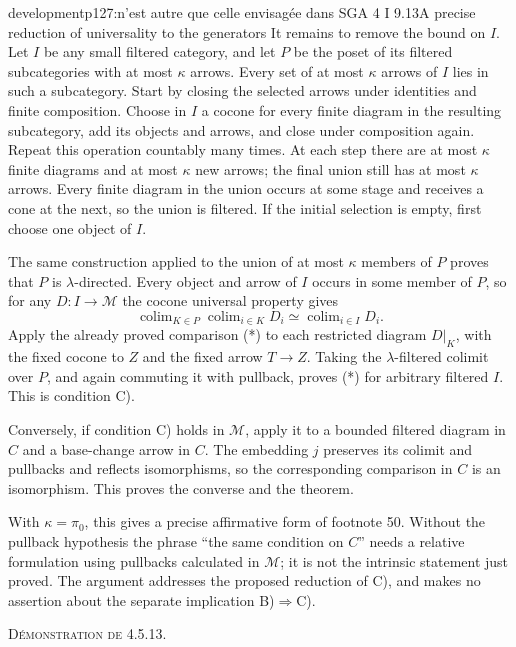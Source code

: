 \begin{dcomment}{development}{p127:n'est autre que celle envisagée dans SGA 4 I 9.13}{A precise reduction of universality to the generators}
It remains to remove the bound on $I$. Let $I$ be any small filtered category, and let $P$ be the poset of its filtered subcategories with at most $\kappa$ arrows. Every set of at most $\kappa$ arrows of $I$ lies in such a subcategory. Start by closing the selected arrows under identities and finite composition. Choose in $I$ a cocone for every finite diagram in the resulting subcategory, add its objects and arrows, and close under composition again. Repeat this operation countably many times. At each step there are at most $\kappa$ finite diagrams and at most $\kappa$ new arrows; the final union still has at most $\kappa$ arrows. Every finite diagram in the union occurs at some stage and receives a cone at the next, so the union is filtered. If the initial selection is empty, first choose one object of $I$.

The same construction applied to the union of at most $\kappa$ members of $P$ proves that $P$ is $\lambda$-directed. Every object and arrow of $I$ occurs in some member of $P$, so for any $D:I\to\mathcal M$ the cocone universal property gives
\[
 \operatorname{colim}_{K\in P}\operatorname{colim}_{i\in K}D_i
   \simeq\operatorname{colim}_{i\in I}D_i.
\]
Apply the already proved comparison (*) to each restricted diagram $D|_K$, with the fixed cocone to $Z$ and the fixed arrow $T\to Z$. Taking the $\lambda$-filtered colimit over $P$, and again commuting it with pullback, proves (*) for arbitrary filtered $I$. This is condition C).

Conversely, if condition C) holds in $\mathcal M$, apply it to a bounded filtered diagram in $C$ and a base-change arrow in $C$. The embedding $j$ preserves its colimit and pullbacks and reflects isomorphisms, so the corresponding comparison in $C$ is an isomorphism. This proves the converse and the theorem.

With $\kappa=\pi_0$, this gives a precise affirmative form of footnote 50. Without the pullback hypothesis the phrase ``the same condition on $C$'' needs a relative formulation using pullbacks calculated in $\mathcal M$; it is not the intrinsic statement just proved. The argument addresses the proposed reduction of C), and makes no assertion about the separate implication B)$\Rightarrow$C).
\end{dcomment}


\textsc{Démonstration de 4.5.13.}


